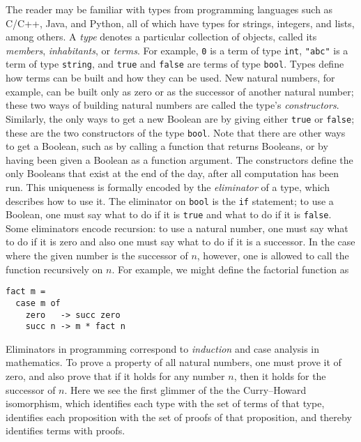 The reader may be familiar with types from programming languages such as C/C++, Java, and Python, all of which have types for strings, integers, and lists, among others.
A \emph{type} denotes a particular collection of objects, called its \emph{members}, \emph{inhabitants}, or \emph{terms}.
For example, \texttt{0} is a term of type \texttt{int}, \verb|"abc"| is a term of type \texttt{string}, and \texttt{true} and \texttt{false} are terms of type \texttt{bool}.
Types define how terms can be built and how they can be used.
New natural numbers, for example, can be built only as zero or as the successor of another natural number; these two ways of building natural numbers are called the type's \emph{constructors}.
Similarly, the only ways to get a new Boolean are by giving either \texttt{true} or \texttt{false}; these are the two constructors of the type \texttt{bool}.
Note that there are other ways to get a Boolean, such as by calling a function that returns Booleans, or by having been given a Boolean as a function argument.
The constructors define the only Booleans that exist at the end of the day, after all computation has been run.
This uniqueness is formally encoded by the \emph{eliminator} of a type, which describes how to use it.
The eliminator on \texttt{bool} is the \texttt{if} statement; to use a Boolean, one must say what to do if it is \texttt{true} and what to do if it is \texttt{false}.
Some eliminators encode recursion: to use a natural number, one must say what to do if it is zero and also one must say what to do if it is a successor.
In the case where the given number is the successor of $n$, however, one is allowed to call the function recursively on $n$.
For example, we might define the factorial function as
\begin{verbatim}
fact m =
  case m of
    zero   -> succ zero
    succ n -> m * fact n
\end{verbatim}

Eliminators in programming correspond to \emph{induction} and case analysis in mathematics.
To prove a property of all natural numbers, one must prove it of zero, and also prove that if it holds for any number $n$, then it holds for the successor of $n$.
Here we see the first glimmer of the the Curry--Howard isomorphism, which identifies each type with the set of terms of that type, identifies each proposition with the set of proofs of that proposition, and thereby identifies terms with proofs.

